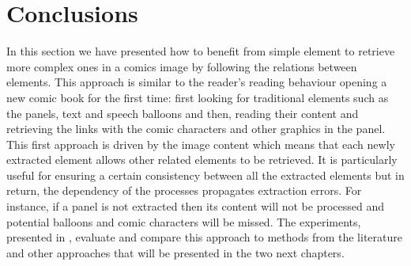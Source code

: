 


\section{Conclusions}
\label{sec:se:conclusion}
In this section we have presented how to benefit from simple element to retrieve more complex ones in a comics image by following the relations between elements.
This approach is similar to the reader's reading behaviour opening a new comic book for the first time: first looking for traditional elements such as the panels, text and speech balloons and then, reading their content and retrieving the links with the comic characters and other graphics in the panel.
This first approach is driven by the image content which means that each newly extracted element allows other related elements to be retrieved.
It is particularly useful for ensuring a certain consistency between all the extracted elements but in return, the dependency of the processes propagates extraction errors.
For instance, if a panel is not extracted then its content will not be processed and potential balloons and comic characters will be missed.
The experiments, presented in , evaluate and compare this approach to methods from the literature and other approaches that will be presented in the two next chapters.


